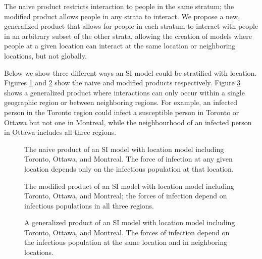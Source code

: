 The naive product restricts interaction to people in the same stratum; the modified product allows people in any strata to interact. We propose a new, generalized product that allows for people in each stratum to interact with people in an arbitrary subset of the other strata, allowing the creation of models where people at a given location can interact at the same location or neighboring locations, but not globally.


Below we show three different ways an SI model could be stratified with location. Figures \ref{fig:spat_n} and \ref{fig:spat_m} show the naive and modified products respectively. Figure \ref{fig:spat_g} shows a generalized product where interactions can only occur within a single geographic region or between neighboring regions. For example, an infected person in the Toronto region could infect a susceptible person in Toronto or Ottawa but not one in Montreal, while the neighbourhood of an infected person in Ottawa includes all three regions.

\FloatBarrier

\begin{figure}
    \centering
    
    \caption{The naive product of an SI model with location model including Toronto, Ottawa, and Montreal. The force of infection at any given location depends only on the infectious population at that location.}
    \label{fig:spat_n}
\end{figure}

\begin{figure}
    \centering
    
    \caption{The modified product of an SI model with location model including Toronto, Ottawa, and Montreal; the forces of infection depend on infectious populations in all three regions.}
    \label{fig:spat_m}
\end{figure}

\begin{figure}
    \centering
    
    \caption{A generalized product of an SI model with location model including Toronto, Ottawa, and Montreal. The forces of infection depend on the infectious population at the same location and in neighboring locations.}
    \label{fig:spat_g}
\end{figure}

